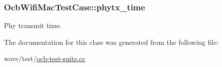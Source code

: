 \subsubsection[{\texorpdfstring{phytx\+\_\+time}{phytx_time}}]{ Ocb\+Wifi\+Mac\+Test\+Case\+::phytx\+\_\+time\hspace{0.3cm}{\ttfamily [private]}}\hypertarget{classOcbWifiMacTestCase_a0a14009e9033e7b904415e5f9bb6781f}{}\label{classOcbWifiMacTestCase_a0a14009e9033e7b904415e5f9bb6781f}


Phy transmit time. 



The documentation for this class was generated from the following file\+:\begin{DoxyCompactItemize}
\item 
wave/test/\hyperlink{ocb-test-suite_8cc}{ocb-\/test-\/suite.\+cc}\end{DoxyCompactItemize}
